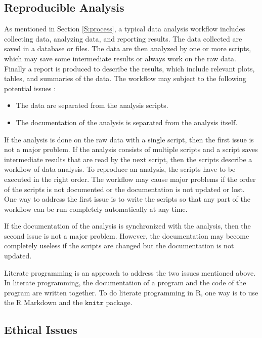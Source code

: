 \documentclass[]{book}
\theoremstyle{definition}
\theoremstyle{definition}
\theoremstyle{definition}
\theoremstyle{remark}
\begin{document}
\subsection{Reproducible Analysis}\label{reproducible-analysis}

As mentioned in Section \ref{S:process}, a typical data analysis
workflow includes collecting data, analyzing data, and reporting
results. The data collected are saved in a database or files. The data
are then analyzed by one or more scripts, which may save some
intermediate results or always work on the raw data. Finally a report is
produced to describe the results, which include relevant plots, tables,
and summaries of the data. The workflow may subject to the following
potential issues \citep[Chapter 2]{mailund2017}:

\begin{itemize}
\item
  The data are separated from the analysis scripts.
\item
  The documentation of the analysis is separated from the analysis
  itself.
\end{itemize}

If the analysis is done on the raw data with a single script, then the
first issue is not a major problem. If the analysis consists of multiple
scripts and a script saves intermediate results that are read by the
next script, then the scripts describe a workflow of data analysis. To
reproduce an analysis, the scripts have to be executed in the right
order. The workflow may cause major problems if the order of the scripts
is not documented or the documentation is not updated or lost. One way
to address the first issue is to write the scripts so that any part of
the workflow can be run completely automatically at any time.

If the documentation of the analysis is synchronized with the analysis,
then the second issue is not a major problem. However, the documentation
may become completely useless if the scripts are changed but the
documentation is not updated.

Literate programming is an approach to address the two issues mentioned
above. In literate programming, the documentation of a program and the
code of the program are written together. To do literate programming in
R, one way is to use the R Markdown and the \(\texttt{knitr}\) package.

\subsection{Ethical Issues}\label{ethical-issues}
\end{document}
